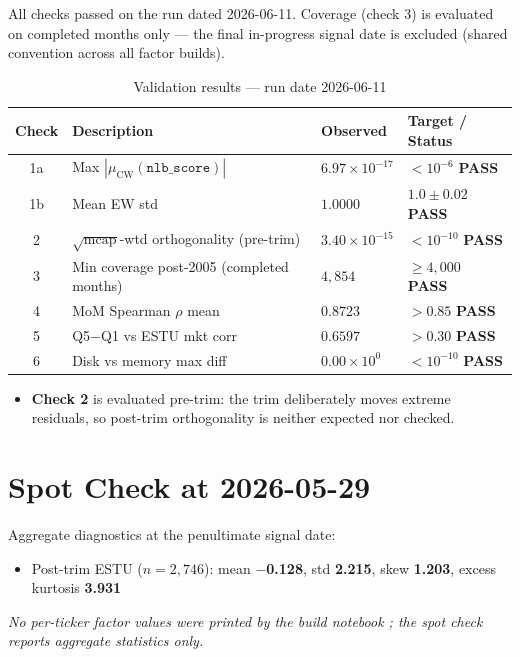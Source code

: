 \documentclass[11pt,a4paper]{article}
\newcommand{\PASS}[1]{\textcolor{pass}{\textbf{#1}}}
\newcommand{\NOTE}[1]{\textcolor{note}{\textit{#1}}}
\begin{document}
All checks passed on the run dated 2026-06-11. Coverage (check 3) is evaluated
on completed months only --- the final in-progress signal date is excluded
(shared convention across all factor builds).

\begin{table}[h!]
\centering
\caption{Validation results --- run date 2026-06-11}
\small
\begin{tabular}{clll}
\toprule
\textbf{Check} & \textbf{Description} & \textbf{Observed} & \textbf{Target / Status} \\
\midrule
1a & Max $|\mu_{\text{CW}}(\texttt{nlb\_score})|$ & $6.97\times10^{-17}$ & $<10^{-6}$ \quad \PASS{PASS} \\
1b & Mean EW std & $1.0000$ & $1.0\pm0.02$ \quad \PASS{PASS} \\
2 & $\sqrt{\text{mcap}}$-wtd orthogonality (pre-trim) & $3.40\times10^{-15}$ & $<10^{-10}$ \quad \PASS{PASS} \\
3 & Min coverage post-2005 (completed months) & $4{,}854$ & $\geq4{,}000$ \quad \PASS{PASS} \\
4 & MoM Spearman $\rho$ mean & $0.8723$ & $>0.85$ \quad \PASS{PASS} \\
5 & Q5$-$Q1 vs ESTU mkt corr & $0.6597$ & $>0.30$ \quad \PASS{PASS} \\
6 & Disk vs memory max diff & $0.00\times10^{0}$ & $<10^{-10}$ \quad \PASS{PASS} \\
\bottomrule
\end{tabular}
\end{table}

\begin{itemize}[leftmargin=*,topsep=2pt,itemsep=2pt]
  \item \textbf{Check 2} is evaluated pre-trim: the trim deliberately moves extreme residuals, so post-trim orthogonality is neither expected nor checked.
\end{itemize}

\section{Spot Check at 2026-05-29}

Aggregate diagnostics at the penultimate signal date:

\begin{itemize}[leftmargin=*,topsep=2pt,itemsep=2pt]
  \item Post-trim ESTU ($n=2{,}746$): mean \textbf{$-$0.128}, std \textbf{2.215}, skew \textbf{1.203}, excess kurtosis \textbf{3.931}
\end{itemize}

\NOTE{No per-ticker factor values were printed by the build notebook
; the spot check reports aggregate statistics only.}
\end{document}

